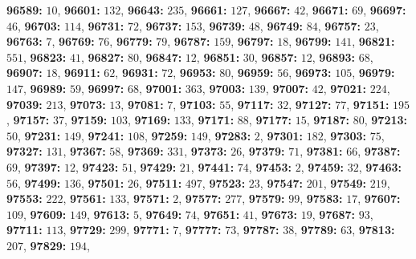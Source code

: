 \textsf{\bfseries 96589:} $10$, \textsf{\bfseries 96601:} $132$, \textsf{\bfseries 96643:} $235$, \textsf{\bfseries 96661:} $127$, \textsf{\bfseries 96667:} $42$, \textsf{\bfseries 96671:} $69$, \textsf{\bfseries 96697:} $46$, \textsf{\bfseries 96703:} $114$, \textsf{\bfseries 96731:} $72$, \textsf{\bfseries 96737:} $153$, \textsf{\bfseries 96739:} $48$, \textsf{\bfseries 96749:} $84$, \textsf{\bfseries 96757:} $23$, \textsf{\bfseries 96763:} $7$, \textsf{\bfseries 96769:} $76$, \textsf{\bfseries 96779:} $79$, \textsf{\bfseries 96787:} $159$, \textsf{\bfseries 96797:} $18$, \textsf{\bfseries 96799:} $141$, \textsf{\bfseries 96821:} $551$, \textsf{\bfseries 96823:} $41$, \textsf{\bfseries 96827:} $80$, \textsf{\bfseries 96847:} $12$, \textsf{\bfseries 96851:} $30$, \textsf{\bfseries 96857:} $12$, \textsf{\bfseries 96893:} $68$, \textsf{\bfseries 96907:} $18$, \textsf{\bfseries 96911:} $62$, \textsf{\bfseries 96931:} $72$, \textsf{\bfseries 96953:} $80$, \textsf{\bfseries 96959:} $56$, \textsf{\bfseries 96973:} $105$, \textsf{\bfseries 96979:} $147$, \textsf{\bfseries 96989:} $59$, \textsf{\bfseries 96997:} $68$, \textsf{\bfseries 97001:} $363$, \textsf{\bfseries 97003:} $139$, \textsf{\bfseries 97007:} $42$, \textsf{\bfseries 97021:} $224$, \textsf{\bfseries 97039:} $213$, \textsf{\bfseries 97073:} $13$, \textsf{\bfseries 97081:} $7$, \textsf{\bfseries 97103:} $55$, \textsf{\bfseries 97117:} $32$, \textsf{\bfseries 97127:} $77$, \textsf{\bfseries 97151:} $195$, \textsf{\bfseries 97157:} $37$, \textsf{\bfseries 97159:} $103$, \textsf{\bfseries 97169:} $133$, \textsf{\bfseries 97171:} $88$, \textsf{\bfseries 97177:} $15$, \textsf{\bfseries 97187:} $80$, \textsf{\bfseries 97213:} $50$, \textsf{\bfseries 97231:} $149$, \textsf{\bfseries 97241:} $108$, \textsf{\bfseries 97259:} $149$, \textsf{\bfseries 97283:} $2$, \textsf{\bfseries 97301:} $182$, \textsf{\bfseries 97303:} $75$, \textsf{\bfseries 97327:} $131$, \textsf{\bfseries 97367:} $58$, \textsf{\bfseries 97369:} $331$, \textsf{\bfseries 97373:} $26$, \textsf{\bfseries 97379:} $71$, \textsf{\bfseries 97381:} $66$, \textsf{\bfseries 97387:} $69$, \textsf{\bfseries 97397:} $12$, \textsf{\bfseries 97423:} $51$, \textsf{\bfseries 97429:} $21$, \textsf{\bfseries 97441:} $74$, \textsf{\bfseries 97453:} $2$, \textsf{\bfseries 97459:} $32$, \textsf{\bfseries 97463:} $56$, \textsf{\bfseries 97499:} $136$, \textsf{\bfseries 97501:} $26$, \textsf{\bfseries 97511:} $497$, \textsf{\bfseries 97523:} $23$, \textsf{\bfseries 97547:} $201$, \textsf{\bfseries 97549:} $219$, \textsf{\bfseries 97553:} $222$, \textsf{\bfseries 97561:} $133$, \textsf{\bfseries 97571:} $2$, \textsf{\bfseries 97577:} $277$, \textsf{\bfseries 97579:} $99$, \textsf{\bfseries 97583:} $17$, \textsf{\bfseries 97607:} $109$, \textsf{\bfseries 97609:} $149$, \textsf{\bfseries 97613:} $5$, \textsf{\bfseries 97649:} $74$, \textsf{\bfseries 97651:} $41$, \textsf{\bfseries 97673:} $19$, \textsf{\bfseries 97687:} $93$, \textsf{\bfseries 97711:} $113$, \textsf{\bfseries 97729:} $299$, \textsf{\bfseries 97771:} $7$, \textsf{\bfseries 97777:} $73$, \textsf{\bfseries 97787:} $38$, \textsf{\bfseries 97789:} $63$, \textsf{\bfseries 97813:} $207$, \textsf{\bfseries 97829:} $194$, 
